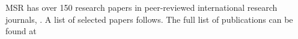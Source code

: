 
\nocite{*}

MSR has over 150 research papers in peer-reviewed international research journals, 
. A list of selected papers follows. The full list of publications can be found at 


\printbibliography[heading={none}]





